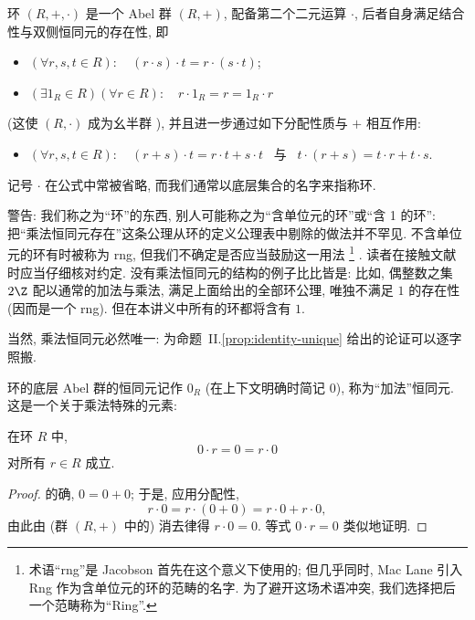 \begin{definition}
\label{def:ring}
环%
$(R, +, \cdot)$ 是一个 Abel 群 $(R, +)$, 配备第二个二元运算 $\cdot$, 后者自身满足结合性与双侧恒同元的存在性, 即
\begin{itemize}
	\item $(\forall r, s, t \in R): \quad (r \cdot s) \cdot t = r \cdot (s \cdot t)$;
	\item $(\exists 1_R \in R) (\forall r \in R): \quad r \cdot 1_R = r = 1_R \cdot r$
\end{itemize}
(这使 $(R, \cdot)$ 成为幺半群%
), 并且进一步通过如下分配性质与 $+$ 相互作用:
\begin{itemize}
	\item $(\forall r, s, t \in R): \quad (r + s) \cdot t = r \cdot t + s \cdot t$ \ 与 \ $t \cdot (r + s) = t \cdot r + t \cdot s$.
\end{itemize}
\end{definition}

记号 $\cdot$ 在公式中常被省略, 而我们通常以底层集合的名字来指称环.

警告: 我们称之为``环''的东西, 别人可能称之为``含单位元的环''或``含 1 的环'': 把``乘法恒同元存在''这条公理从环的定义公理表中剔除的做法并不罕见. 不含单位元的环有时被称为 rng, 但我们不确定是否应当鼓励这一用法%
\footnote{术语``rng''是 Jacobson 首先在这个意义下使用的; 但几乎同时, Mac Lane 引入 Rng 作为含单位元的环的范畴的名字. 为了避开这场术语冲突, 我们选择把后一个范畴称为``Ring''.}%
. 读者在接触文献时应当仔细核对约定. 没有乘法恒同元的结构的例子比比皆是: 比如, 偶整数之集 $2\Z$ 配以通常的加法与乘法, 满足上面给出的全部环公理, 唯独不满足 $1$ 的存在性 (因而是一个 rng). 但在本讲义中所有的环都将含有 $1$.

当然, 乘法恒同元必然唯一: 为命题~II.\ref{prop:identity-unique} 给出的论证可以逐字照搬.

环的底层 Abel 群的恒同元记作 $0_R$ (在上下文明确时简记 $0$), 称为``加法''恒同元. 这是一个关于乘法特殊的元素:

\begin{lemma}
\label{lem:zero-mult}
在环 $R$ 中,
\[
0 \cdot r = 0 = r \cdot 0
\]
对所有 $r \in R$ 成立.
\end{lemma}

\begin{proof}
的确, $0 = 0 + 0$; 于是, 应用分配性,
\[
r \cdot 0 = r \cdot (0 + 0) = r \cdot 0 + r \cdot 0,
\]
由此由 (群 $(R, +)$ 中的) 消去律得 $r \cdot 0 = 0$. 等式 $0 \cdot r = 0$ 类似地证明.
\end{proof}

